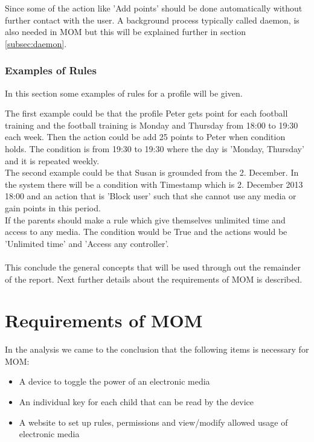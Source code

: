 Since some of the action like 'Add points' should be done automatically without further contact with the user. A background process typically called daemon, is also needed in MOM but this will be explained further in section \ref{subsec:daemon}. 
	
\subsubsection{Examples of Rules}
In this section some examples of rules for a profile will be given.

The first example could be that the profile Peter gets point for each football training and the football training is Monday and Thursday from 18:00 to 19:30 each week. Then the action could be add 25 points to Peter when condition holds. The condition is from 19:30 to 19:30 where the day is 'Monday, Thursday' and it is repeated weekly. \\

The second example could be that Susan is grounded from the 2. December. In the system there will be a condition with Timestamp which is 2. December 2013 18:00
and an action that is 'Block user' such that she cannot use any media or gain points in this period. \\

If the parents should make a rule which give themselves unlimited time and access to any media. The condition would be True and the actions would be 'Unlimited time' and 'Access any controller'.\\\\

This conclude the general concepts that will be used through out the remainder of the report. Next further details about the requirements of MOM is described.  


\section{Requirements of MOM}
\label{sec:RequirMOM}

In the analysis we came to the conclusion that the following items is necessary for MOM: 
\begin{itemize}
	\item A device to toggle the power of an electronic media
	\item An individual key for each child that can be read by the device
	\item A website to set up rules, permissions and view/modify allowed usage of electronic media
\end{itemize} 


